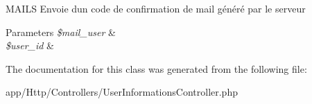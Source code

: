 M\+A\+I\+LS Envoie d\textquotesingle{}un code de confirmation de mail généré par le serveur 
\begin{DoxyParams}{Parameters}
{\em \$mail\+\_\+user} & \\
\hline
{\em \$user\+\_\+id} & \\
\hline
\end{DoxyParams}


The documentation for this class was generated from the following file\+:\begin{DoxyCompactItemize}
\item 
app/\+Http/\+Controllers/User\+Informations\+Controller.\+php\end{DoxyCompactItemize}
